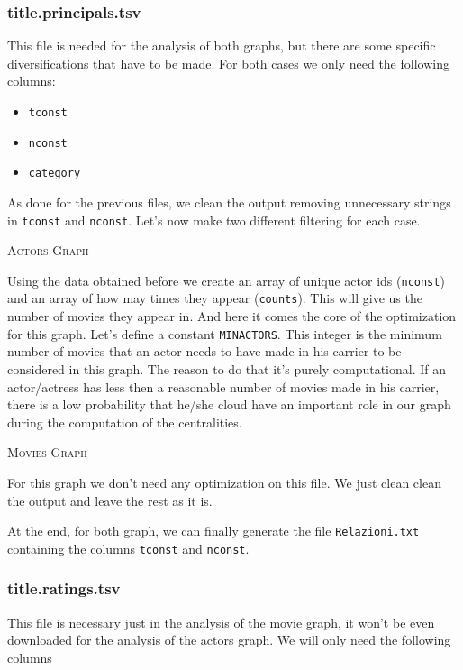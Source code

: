 \subsubsection{title.principals.tsv}

This file is needed for the analysis of both graphs, but there are some specific diversifications that have to be made. For both cases we only need the following columns:

\begin{itemize}
    \item \texttt{tconst}
    \item \texttt{nconst}
    \item \texttt{category}
\end{itemize}

\noindent As done for the previous files, we clean the output removing unnecessary strings in \texttt{tconst} and \texttt{nconst}. Let's now make two different filtering for each case.\s

\textsc{Actors Graph}
\s

\noindent Using the data obtained  before we create an array of unique actor ids (\texttt{nconst}) and an array of how may times they appear (\texttt{counts}). This will give us the number of movies they appear in. And here it comes the core of the optimization for this graph. Let's define a constant \texttt{MIN\textunderscore ACTORS}. This integer is the minimum number of movies that an actor needs to have made in his carrier to be considered in this graph. The reason to do that it's purely computational. If an actor/actress has less then a reasonable number of movies made in his carrier, there is a low probability that he/she cloud have an important role in our graph during the computation of the centralities. \s

\textsc{Movies Graph} \s

\noindent For this graph we don't need any optimization on this file. We just clean clean the output and leave the rest as it is. \s

\nd At the end, for both graph, we can finally generate the file \texttt{Relazioni.txt} containing the columns \texttt{tconst} and \texttt{nconst}.

\subsubsection{title.ratings.tsv}

This file is necessary just in the analysis of the movie graph, it won't be even downloaded for the analysis of the actors graph. We will only need the following columns

